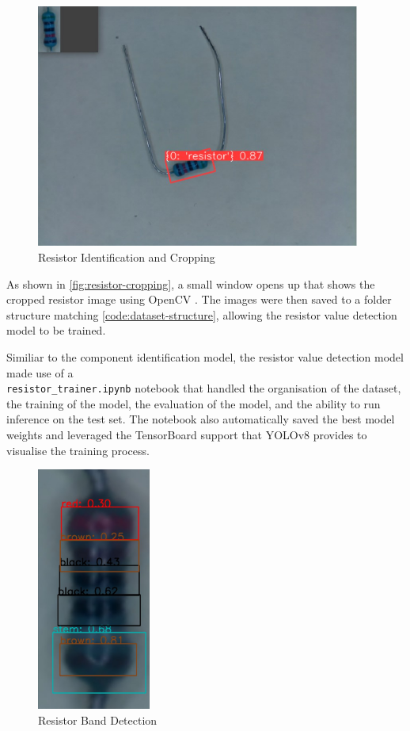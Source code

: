 \begin{figure}[H]
  \hfill
  \begin{minipage}[t]{\textwidth}
    \centering
    \includegraphics[height=8cm]{imgs/cv/2024-06-10_21-45-23_python.jpg}
    \caption{Resistor Identification and Cropping}
    \label{fig:resistor-cropping}
  \end{minipage}
\end{figure}

As shown in \autoref{fig:resistor-cropping}, a small window opens up that shows the cropped resistor image using OpenCV \cite{home_2024}. The images were then saved to a folder structure matching \autoref{code:dataset-structure}, allowing the resistor value detection model to be trained.

Similiar to the component identification model, the resistor value detection model made use of a 
\\ \texttt{resistor\_trainer.ipynb} notebook that handled the organisation of the dataset, the training of the model, the evaluation of the model, and the ability to run inference on the test set. The notebook also automatically saved the best model weights and leveraged the TensorBoard support that YOLOv8 provides to visualise the training process.

\begin{figure}[H]
  \hfill
  \begin{minipage}[t]{\textwidth}
    \centering
    \includegraphics[height=8cm]{imgs/cv/banddetection.jpg}
    \caption{Resistor Band Detection}
    \label{fig:band-detection}
  \end{minipage}
\end{figure}

